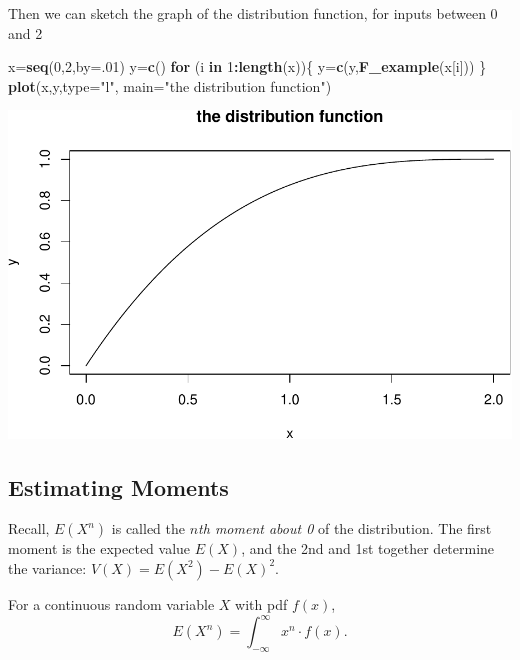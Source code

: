 \documentclass[
]{book}
\newenvironment{Shaded}{\begin{snugshade}}{\end{snugshade}}
\newcommand{\AttributeTok}[1]{\textcolor[rgb]{0.13,0.29,0.53}{#1}}
\newcommand{\ControlFlowTok}[1]{\textcolor[rgb]{0.13,0.29,0.53}{\textbf{#1}}}
\newcommand{\DecValTok}[1]{\textcolor[rgb]{0.00,0.00,0.81}{#1}}
\newcommand{\FunctionTok}[1]{\textcolor[rgb]{0.13,0.29,0.53}{\textbf{#1}}}
\newcommand{\NormalTok}[1]{#1}
\newcommand{\OtherTok}[1]{\textcolor[rgb]{0.56,0.35,0.01}{#1}}
\newcommand{\SpecialCharTok}[1]{\textcolor[rgb]{0.81,0.36,0.00}{\textbf{#1}}}
\newcommand{\StringTok}[1]{\textcolor[rgb]{0.31,0.60,0.02}{#1}}
\theoremstyle{definition}
\theoremstyle{definition}
\theoremstyle{definition}
\theoremstyle{definition}
\theoremstyle{remark}
\begin{document}
Then we can sketch the graph of the distribution function, for inputs between 0 and 2

\begin{Shaded}
\begin{Highlighting}[]
\NormalTok{x}\OtherTok{=}\FunctionTok{seq}\NormalTok{(}\DecValTok{0}\NormalTok{,}\DecValTok{2}\NormalTok{,}\AttributeTok{by=}\NormalTok{.}\DecValTok{01}\NormalTok{)}
\NormalTok{y}\OtherTok{=}\FunctionTok{c}\NormalTok{()}
\ControlFlowTok{for}\NormalTok{ (i }\ControlFlowTok{in} \DecValTok{1}\SpecialCharTok{:}\FunctionTok{length}\NormalTok{(x))\{}
\NormalTok{  y}\OtherTok{=}\FunctionTok{c}\NormalTok{(y,}\FunctionTok{F\_example}\NormalTok{(x[i]))}
\NormalTok{\}}
\FunctionTok{plot}\NormalTok{(x,y,}\AttributeTok{type=}\StringTok{"l"}\NormalTok{,}
     \AttributeTok{main=}\StringTok{"the distribution function"}\NormalTok{)}
\end{Highlighting}
\end{Shaded}

\includegraphics{math340-notes_files/figure-latex/plot distn fcn-1.pdf}

\subsection*{Estimating Moments}\label{estimating-moments}

Recall, \(E(X^n)\) is called the \emph{\(n\)th moment about 0} of the distribution. The first moment is the expected value \(E(X)\), and the 2nd and 1st together determine the variance: \(V(X) = E(X^2)-E(X)^2.\)

For a continuous random variable \(X\) with pdf \(f(x)\), \[E(X^n) = \int_{-\infty}^\infty x^n \cdot f(x).\]
\end{document}
